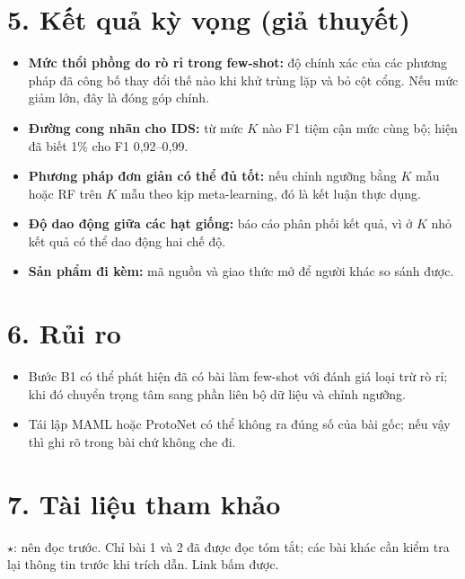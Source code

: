 \documentclass[10pt,a4paper,landscape]{article}
\begin{document}
\section*{5. Kết quả kỳ vọng (giả thuyết)}
\begin{itemize}
  \item \textbf{Mức thổi phồng do rò rỉ trong few-shot:} độ chính xác của các phương pháp đã công bố thay đổi thế nào khi khử trùng lặp và bỏ cột cổng. Nếu mức giảm lớn, đây là đóng góp chính.
  \item \textbf{Đường cong nhãn cho IDS:} từ mức $K$ nào F1 tiệm cận mức cùng bộ; hiện đã biết 1\% cho F1 0,92--0,99.
  \item \textbf{Phương pháp đơn giản có thể đủ tốt:} nếu chỉnh ngưỡng bằng $K$ mẫu hoặc RF trên $K$ mẫu theo kịp meta-learning, đó là kết luận thực dụng.
  \item \textbf{Độ dao động giữa các hạt giống:} báo cáo phân phối kết quả, vì ở $K$ nhỏ kết quả có thể dao động hai chế độ.
  \item \textbf{Sản phẩm đi kèm:} mã nguồn và giao thức mở để người khác so sánh được.
\end{itemize}

\section*{6. Rủi ro}
\begin{itemize}
  \item Bước B1 có thể phát hiện đã có bài làm few-shot với đánh giá loại trừ rò rỉ; khi đó chuyển trọng tâm sang phần liên bộ dữ liệu và chỉnh ngưỡng.
  \item Tái lập MAML hoặc ProtoNet có thể không ra đúng số của bài gốc; nếu vậy thì ghi rõ trong bài chứ không che đi.
\end{itemize}

\newpage
\section*{7. Tài liệu tham khảo}
{\small $\star$: nên đọc trước. Chỉ bài 1 và 2 đã được đọc tóm tắt; các bài khác cần kiểm tra lại thông tin trước khi trích dẫn. Link bấm được.}\par\medskip
\end{document}

